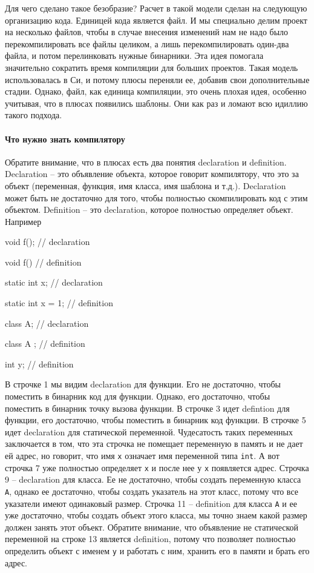 Для чего сделано такое безобразие?
Расчет в такой модели сделан на следующую организацию кода.
Единицей кода является файл.
И мы специально делим проект на несколько файлов, чтобы в случае внесения изменений нам не надо было перекомпилировать все файлы целиком, а лишь перекомпилировать один-два файла, и потом перелинковать нужные бинарники.
Эта идея помогала значительно сократить время компиляции для больших проектов.
Такая модель использовалась в Си, и потому плюсы переняли ее, добавив свои дополнительные стадии.
Однако, файл, как единица компиляции, это очень плохая идея, особенно учитывая, что в плюсах появились шаблоны.
Они как раз и ломают всю идиллию такого подхода.

\paragraph{Что нужно знать компилятору}

Обратите внимание, что в плюсах есть два понятия declaration и definition.
Declaration -- это объявление объекта, которое говорит компилятору, что это за объект (переменная, функция, имя класса, имя шаблона и т.д.).
Declaration может быть не достаточно для того, чтобы полностью скомпилировать код с этим объектом.
Definition -- это declaration, которое полностью определяет объект.
Например
\begin{cppcode}
void f(); // declaration

void f() {} // definition

static int x; // declaration

static int x = 1; // definition

class A; // declaration

class A {}; // definition

int y; // definition
\end{cppcode}
В строчке 1 мы видим declaration для функции.
Его не достаточно, чтобы поместить в бинарник код для функции.
Однако, его достаточно, чтобы поместить в бинарник точку вызова функции.
В строчке 3 идет defintion для функции, его достаточно, чтобы поместить в бинарник код функции.
В строчке 5 идет declaration для статической переменной.
Чудесатость таких переменных заключается в том, что эта строчка не помещает переменную в память и не дает ей адрес, но говорит, что имя \verb"x" означает имя переменной типа \verb"int".
А вот строчка 7 уже полностью определяет \verb"x" и после нее у \verb"x" появляется адрес.
Строчка 9 -- declaration для класса.
Ее не достаточно, чтобы создать переменную класса \verb"A", однако ее достаточно, чтобы создать указатель на этот класс, потому что все указатели имеют одинаковый размер.
Строчка 11 -- definition для класса \verb"A" и ее уже достаточно, чтобы создать объект этого класса, мы точно знаем какой размер должен занять этот объект.
Обратите внимание, что объявление не статической переменной на строке 13 является definition, потому что позволяет полностью определить объект с именем \verb"y" и работать с ним, хранить его в памяти и брать его адрес.


